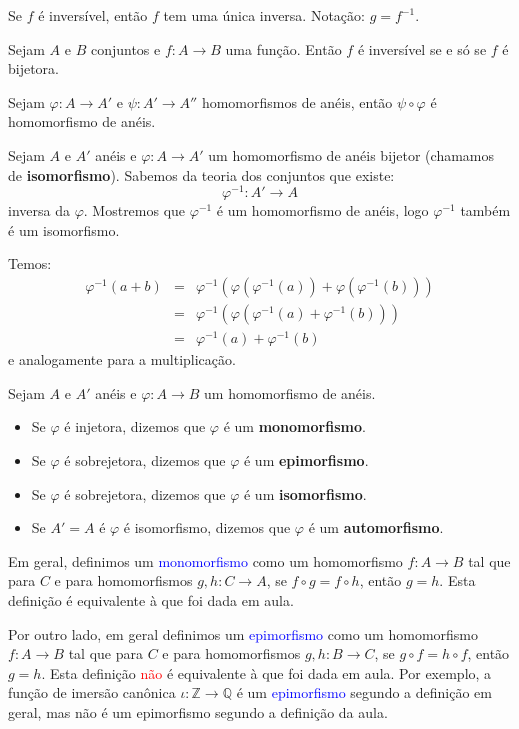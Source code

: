 \documentclass[11pt,twoside,a4paper]{book}
\begin{document}
\medskip
\noindent
Se $f$ é inversível, então $f$ tem uma única inversa. Notação: $g=f^{-1}$.

\medskip
\noindent
Sejam $A$ e $B$ conjuntos e $f:A\rightarrow B$ uma função. Então $f$ é inversível se e só se $f$ é bijetora.

\medskip
\noindent
Sejam $\varphi:A\rightarrow A'$ e $\psi:A'\rightarrow A''$ homomorfismos de anéis, então $\psi\circ\varphi$ é homomorfismo de anéis.

\medskip
\noindent
Sejam $A$ e $A'$ anéis e $\varphi:A\rightarrow A'$ um homomorfismo de anéis bijetor (chamamos de \textbf{isomorfismo}). Sabemos da teoria dos conjuntos que existe:
\[
\varphi^{-1}:A'\rightarrow A
\]
inversa da $\varphi$. Mostremos que $\varphi^{-1}$ é um homomorfismo de anéis, logo $\varphi^{-1}$ também é um isomorfismo.

\medskip
\noindent
Temos:
\[
\begin{array}{rcl}
\varphi^{-1}(a+b)&=&\varphi^{-1}(\varphi(\varphi^{-1}(a))+\varphi(\varphi^{-1}(b)))\\&=&\varphi^{-1}(\varphi(\varphi^{-1}(a)+\varphi^{-1}(b)))\\&=&\varphi^{-1}(a)+\varphi^{-1}(b)
\end{array}
\]
e analogamente para a multiplicação.

\begin{definicao}
Sejam $A$ e $A'$ anéis e $\varphi:A\rightarrow B$ um homomorfismo de anéis.
\begin{itemize}
\item Se $\varphi$ é injetora, dizemos que $\varphi$ é um \textbf{monomorfismo}.
\item Se $\varphi$ é sobrejetora, dizemos que $\varphi$ é um \textbf{epimorfismo}.
\item Se $\varphi$ é sobrejetora, dizemos que $\varphi$ é um \textbf{isomorfismo}.
\item Se $A'=A$ é $\varphi$ é isomorfismo, dizemos que $\varphi$ é um \textbf{automorfismo}.
\end{itemize}
\end{definicao}

\begin{observacao}
Em geral, definimos um \textcolor{blue}{monomorfismo} como um homomorfismo $f:A\rightarrow B$ tal que para $C$ e para homomorfismos $g,h:C\rightarrow A$, se $f\circ g=f\circ h$, então $g=h$. Esta definição é equivalente à que foi dada em aula.

\medskip
\noindent
Por outro lado, em geral definimos um \textcolor{blue}{epimorfismo} como um homomorfismo $f:A\rightarrow B$ tal que para $C$ e para homomorfismos $g,h:B\rightarrow C$, se $g\circ f=h\circ f$, então $g=h$. Esta definição \textcolor{red}{não} é equivalente à que foi dada em aula. Por exemplo, a função de imersão canônica $\iota:\mathbb{Z}\rightarrow\mathbb{Q}$ é um \textcolor{blue}{epimorfismo} segundo a definição em geral, mas não é um epimorfismo segundo a definição da aula.
\end{observacao}
\end{document}
